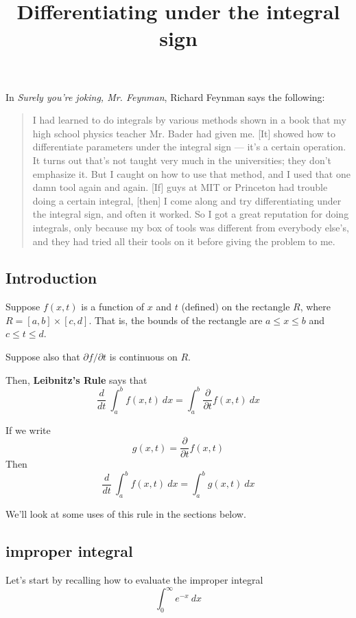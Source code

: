 \documentclass[11pt, oneside]{article}
\title{Differentiating under the integral sign}
\date{}
\begin{document}
\maketitle
\Large


\label{sec:Differentiating_under_the_integral_sign}

In \emph{Surely you're joking, Mr. Feynman}, Richard Feynman says the following:

\begin{quote}I had learned to do integrals by various methods shown in a book that my high school physics teacher Mr. Bader had given me. [It] showed how to differentiate parameters under the integral sign --- it's a certain operation. It turns out that's not taught very much in the universities; they don't emphasize it. But I caught on how to use that method, and I used that one damn tool again and again. [If] guys at MIT or Princeton had trouble doing a certain integral, [then] I come along and try differentiating under the integral sign, and often it worked. So I got a great reputation for doing integrals, only because my box of tools was different from everybody else's, and they had tried all their tools on it before giving the problem to me.\end{quote}

\subsection*{Introduction}

Suppose $f(x,t)$ is a function of $x$ and $t$ (defined) on the rectangle $R$, where $R = [a,b] \times [c,d]$.  That is, the bounds of the rectangle are $a \le x \le b$ and $c \le t \le  d$.

Suppose also that $\partial f/\partial t$ is continuous on $R$.

Then, \textbf{Leibnitz's Rule} says that
\[ \frac{d}{dt} \ \int_a^b f(x,t) \ dx =  \int_a^b  \frac{\partial}{\partial t}  f(x,t) \ dx \]

If we write
\[ g(x,t) = \frac{\partial}{\partial t}  f(x,t)\]
Then
\[ \frac{d}{dt} \ \int_a^b f(x,t) \ dx =  \int_a^b  g(x,t) \ dx \]

We'll look at some uses of this rule in the sections below.

\subsection*{improper integral}
Let's start by recalling how to evaluate the improper integral
\[ \int_0^{\infty} e^{-x} \ dx \]
\end{document}
